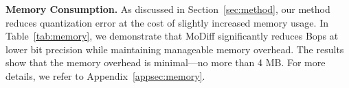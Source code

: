 

\textbf{Memory Consumption.} As discussed in Section~\ref{sec:method}, our method reduces quantization error at the cost of slightly increased memory usage. In Table~\ref{tab:memory}, we demonstrate that MoDiff significantly reduces Bops at lower bit precision while maintaining manageable memory overhead. The results show that the memory overhead is minimal—no more than 4 MB. For more details, we refer to Appendix~\ref{appsec:memory}.


